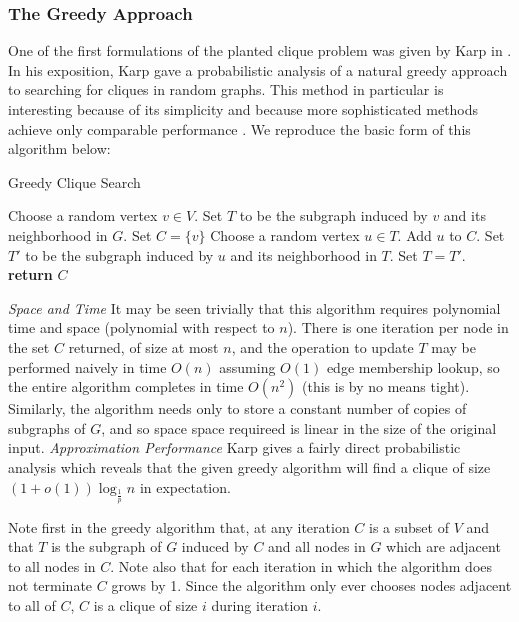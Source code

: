 \documentclass{article}
\theoremstyle{definition}
\begin{document}
\subsubsection{The Greedy Approach}

One of the first formulations of the planted clique problem was given by Karp in 
\cite{PlantedCliqueGreedy}.  In his exposition, Karp gave a probabilistic analysis 
of a natural greedy approach to searching for cliques in random graphs.  This method 
in particular is interesting because of its simplicity and because more sophisticated 
methods achieve only comparable performance \cite{Metropolis}.  We reproduce the basic form of 
this algorithm below:

\begin{algorithm}[H]
\caption{Greedy Clique Search}\label{AMMDecode}
\begin{algorithmic}[1]
\State Choose a random vertex $v \in V$.
\State Set $T$ to be the subgraph induced by $v$ and its neighborhood in $G$.
\State Set $C = \{ v \}$
\State Choose a random vertex $u \in T$.
\State Add $u$ to $C$.
\State Set $T'$ to be the subgraph induced by $u$ and its neighborhood in $T$.
\State Set $T=T'$.
\EndWhile
\State \textbf{return} $C$
\EndProcedure
\end{algorithmic}
\end{algorithm}

\noindent \textit{Space and Time } It may be seen trivially that this algorithm 
requires polynomial time and space (polynomial with respect to $n$).  
There is one iteration per node in the 
set $C$ returned, of size at most $n$, and the operation to update $T$ may be 
performed naively in time $O(n)$ assuming $O(1)$ edge membership lookup, so 
the entire algorithm completes in time $O(n^2)$ (this is by no means tight).
Similarly, the algorithm needs only to store a constant number of copies of 
subgraphs of $G$, and so space space requireed is linear in the size of the original input.
\newline\newline
\noindent \textit{Approximation Performance } Karp gives a fairly direct 
probabilistic analysis which reveals that the given greedy algorithm will find a 
clique of size $(1+o(1)) \log_{\frac{1}{p}}{n}$ in expectation.  

Note first in the greedy algorithm that, at any iteration $C$ is a 
subset of $V$ and that $T$ is the subgraph of $G$ induced by $C$ and all nodes in 
$G$ which are adjacent to all nodes in $C$.  Note also that for each iteration 
in which the algorithm does not terminate $C$ grows by 1.  Since the algorithm 
only ever chooses nodes adjacent to all of $C$, $C$ is a clique of size $i$ during 
iteration $i$.
\end{document}

